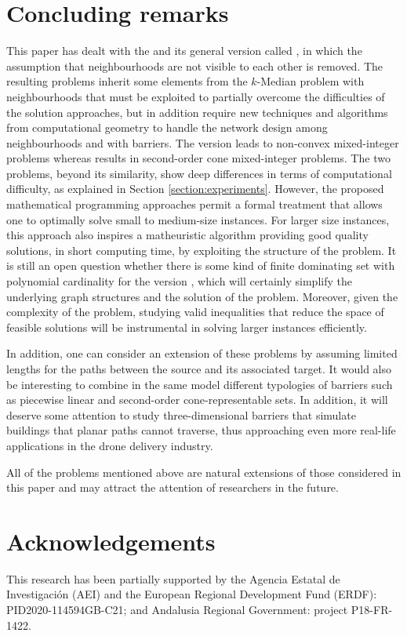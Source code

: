 \documentclass[a4paper,  review, authoryear, 1p.]{elsarticle}
\newcommand{\KMPHN}{{\sf{H-KMPHN}}}
\newcommand{\KMPN}{{\sf{H-KMPN}\xspace }}
\newcommand{\JP}[1]{{\color{blue}#1}}
\begin{document}
		
		\section{Concluding remarks}\label{section:conclusion}
		This paper has dealt with the \KMPHN \xspace and its general version called \KMPN, in which the assumption that neighbourhoods are not visible to each other is removed. \JP{The resulting problems inherit some elements from the $k$-Median problem with neighbourhoods that must be exploited to partially overcome the difficulties of the solution approaches, but in addition require new techniques and algorithms  from computational geometry to handle the network design among neighbourhoods and with barriers. The \KMPN \xspace version leads to  non-convex mixed-integer problems whereas \KMPHN \xspace results in second-order cone mixed-integer problems.} The two problems, beyond its similarity, show deep differences in terms of computational difficulty, as explained in Section \ref{section:experiments}. However, the proposed mathematical programming approaches permit a formal treatment that allows one to optimally solve small to medium-size instances. For larger size instances, this approach also inspires a matheuristic algorithm providing good quality solutions, in short computing time, by exploiting the structure of the problem. It is still an open question whether there is some kind of finite dominating set with polynomial cardinality for the version \KMPHN, which will certainly simplify the underlying graph structures and the solution of the problem. Moreover, given the complexity of the problem, studying valid inequalities that reduce the space of feasible solutions will be instrumental in solving larger instances efficiently. 
		
		In addition, one can consider an extension of these problems by assuming limited lengths for the paths between the source and its associated target. It would also be interesting to combine in the same model different typologies of barriers such as piecewise linear and second-order cone-representable sets. In addition, it will deserve some attention to study three-dimensional barriers that simulate buildings that planar paths cannot traverse, thus approaching even more real-life applications in the drone delivery industry. 
		
		All of the problems mentioned above are natural extensions of those considered in this paper and may attract the attention of researchers in the future.
		
		\section*{Acknowledgements}
		This research has been partially supported by the Agencia Estatal de Investigación (AEI) and the European Regional Development Fund (ERDF): PID2020-114594GB-C21; and Andalusia Regional Government: project P18-FR-1422.
		
		
		
		
		
		
		
	
		
		
		
		
		
		
		
		
		
		
		
		
		
		
		
		
		

	
\end{document}
